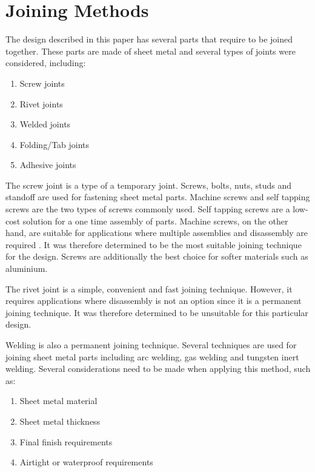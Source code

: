 {\sectionbreak}
\section{Joining Methods}
The design described in this paper has several parts that require to be joined together. These parts are made of sheet metal and several types of joints were considered, including:

\begin{enumerate}[i]
    \item Screw joints
    \item Rivet joints
    \item Welded joints
    \item Folding/Tab joints
    \item Adhesive joints
\end{enumerate}

The screw joint is a type of a temporary joint. Screws, bolts, nuts, studs and standoff are used for fastening sheet metal parts. Machine screws and self tapping screws are the two types of screws commonly used. Self tapping screws are a low-cost solution for a one time assembly of parts. Machine screws, on the other hand, are suitable for applications where multiple assemblies and disassembly are required \cite{admin_how_2018}. It was therefore determined to be the most suitable joining technique for the design. Screws are additionally the best choice for softer materials such as aluminium.
\par
The rivet joint is a simple, convenient and fast joining technique. However, it requires applications where disassembly is not an option since it is a permanent joining technique. It was therefore determined to be unsuitable for this particular design.
\par
Welding is also a permanent joining technique. Several techniques are used for joining sheet metal parts including arc welding, gas welding and tungsten inert welding. Several considerations need to be made when applying this method, such as:
\begin{enumerate}[i]
    \item Sheet metal material
    \item Sheet metal thickness
    \item Final finish requirements
    \item Airtight or waterproof requirements
\end{enumerate}

